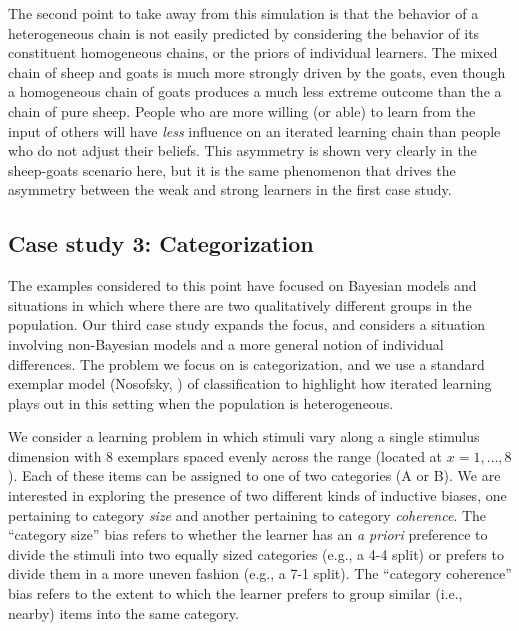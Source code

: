 \documentclass[doc]{apa6}
\begin{document}
The second point to take away from this simulation is that the behavior of a heterogeneous chain is not easily predicted by considering the behavior of its constituent homogeneous chains, or the priors of individual learners. The mixed chain of {\sc sheep} and {\sc goats} is much more strongly driven by the {\sc goats}, even though a homogeneous chain of {\sc goats} produces a much less extreme outcome than the a chain of pure {\sc sheep}. People who are more willing (or able) to learn from the input of others will have {\it less} influence on an iterated learning chain than people who do not adjust their beliefs. This asymmetry is shown very clearly in the {\sc sheep-goats} scenario here, but it is the same phenomenon that drives the asymmetry between the {\sc weak} and {\sc strong} learners in the first case study.

\subsection{Case study 3: Categorization}

The examples considered to this point have focused on Bayesian models and situations in which where there are two qualitatively different groups in the population. Our third case study expands the focus, and considers a situation involving non-Bayesian models and a more general notion of individual differences. The problem we focus on is categorization, and we use a standard exemplar model (Nosofsky, \citeyear{nosofsky_attention_1986}) of classification to highlight how iterated learning plays out in this setting when the population is heterogeneous.

We consider a learning problem in which stimuli vary along a single stimulus dimension with 8 exemplars spaced evenly across the range (located at $x=1,\ldots,8$). Each of these items can be assigned to one of two categories (A or B). We are interested in exploring the presence of two different kinds of inductive biases, one pertaining to category {\it size} and another pertaining to category {\it coherence}. The ``category size'' bias refers to whether the learner has an {\it a priori} preference to divide the stimuli into two equally sized categories (e.g., a 4-4 split) or prefers to divide them in a more uneven fashion (e.g., a 7-1 split). The ``category coherence'' bias refers to the extent to which the learner prefers to group similar (i.e., nearby) items into the same category.
\end{document}
